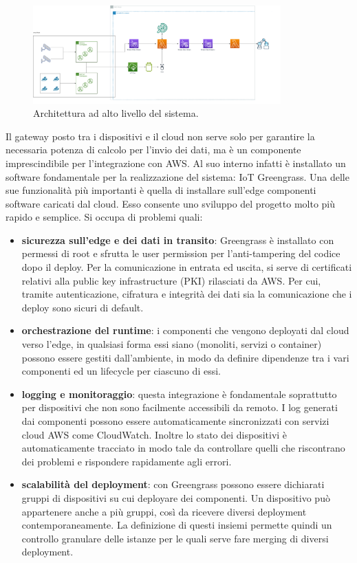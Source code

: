 \begin{figure}[htbp]
    \centering
    \includegraphics[width=0.85\textwidth]{figures/architettura.png}
    \caption{Architettura ad alto livello del sistema.} 
    \label{fig:architettura}
\end{figure}
 

Il gateway posto tra i dispositivi e il cloud non serve solo per garantire la necessaria potenza di calcolo per l’invio dei dati, ma è un componente imprescindibile per l’integrazione con AWS. Al suo interno infatti è installato un software fondamentale per la realizzazione del sistema: IoT Greengrass. Una delle sue funzionalità più importanti è quella di installare sull'edge componenti software caricati dal cloud. Esso consente uno sviluppo del progetto molto più rapido e semplice. Si occupa di problemi quali: 


\begin{itemize}
	\item \textbf{sicurezza sull’edge e dei dati in transito}: Greengrass è installato con permessi di root e sfrutta le user permission per l’anti-tampering del codice dopo il deploy. Per la comunicazione in entrata ed uscita, si serve di certificati relativi alla public key infrastructure (PKI) rilasciati da AWS. Per cui, tramite autenticazione, cifratura e integrità dei dati sia la comunicazione che i deploy sono sicuri di default.
	\item \textbf{orchestrazione del runtime}: i componenti che vengono deployati dal cloud verso l’edge, in qualsiasi forma essi siano (monoliti, servizi o container) possono essere gestiti dall’ambiente, in modo da definire dipendenze tra i vari componenti ed un lifecycle per ciascuno di essi.  
	\item \textbf{logging e monitoraggio}: questa integrazione è fondamentale soprattutto per dispositivi che non sono facilmente accessibili da remoto. I log generati dai componenti possono essere automaticamente sincronizzati con servizi cloud AWS come CloudWatch. Inoltre lo stato dei dispositivi è automaticamente tracciato in modo tale da controllare quelli che riscontrano dei problemi e rispondere rapidamente agli errori.
	\item \textbf{scalabilità del deployment}: con Greengrass possono essere dichiarati gruppi di dispositivi su cui deployare dei componenti. Un dispositivo può appartenere anche a più gruppi, così da ricevere diversi deployment contemporaneamente. La definizione di questi insiemi permette quindi un controllo granulare delle istanze per le quali serve fare merging di diversi deployment.
\end{itemize}

